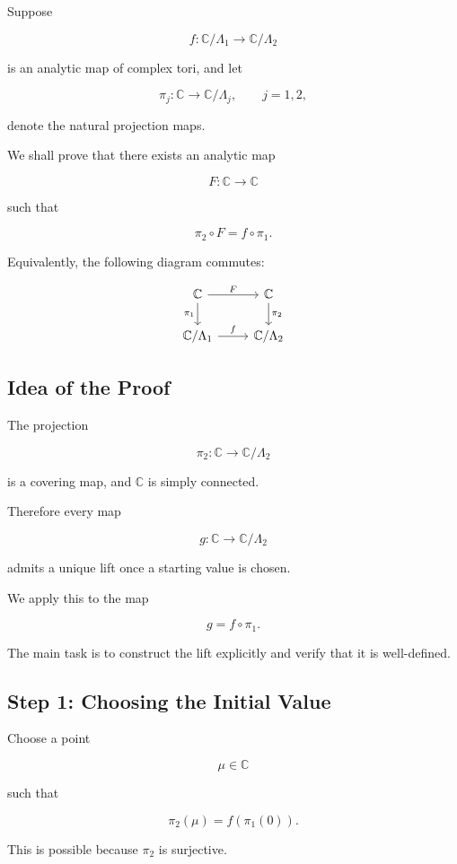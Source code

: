 \documentclass[12pt,a4paper]{article}
\theoremstyle{notespace}
\begin{document}
Suppose

\[
f:\mathbb C/\Lambda_1 \longrightarrow \mathbb C/\Lambda_2
\]

is an analytic map of complex tori, and let

\[
\pi_j:\mathbb C\to \mathbb C/\Lambda_j,
\qquad j=1,2,
\]

denote the natural projection maps.

We shall prove that there exists an analytic map

\[
F:\mathbb C\to\mathbb C
\]

such that

\[
\boxed{
	\pi_2\circ F
	=
	f\circ\pi_1.
}
\]

Equivalently, the following diagram commutes:

\[
\begin{tikzcd}
	\mathbb C \arrow[r,"F"] \arrow[d,"\pi_1"']
	&
	\mathbb C \arrow[d,"\pi_2"]
	\\
	\mathbb C/\Lambda_1 \arrow[r,"f"]
	&
	\mathbb C/\Lambda_2
\end{tikzcd}
\]

\subsection{Idea of the Proof}

The projection

\[
\pi_2:\mathbb C\to\mathbb C/\Lambda_2
\]

is a covering map, and \(\mathbb C\) is simply connected.

Therefore every map

\[
g:\mathbb C\to\mathbb C/\Lambda_2
\]

admits a unique lift once a starting value is chosen.

We apply this to the map

\[
g=f\circ\pi_1.
\]

The main task is to construct the lift explicitly and verify that it is well-defined.

\subsection{Step 1: Choosing the Initial Value}

Choose a point

\[
\mu\in\mathbb C
\]

such that

\[
\pi_2(\mu)
=
f(\pi_1(0)).
\]

This is possible because \(\pi_2\) is surjective.
\end{document}
